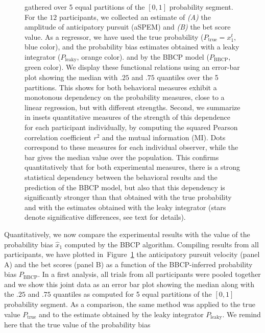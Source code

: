 \documentclass[10pt,letterpaper]{article}
\newcommand{\seeFig}[1]{Figure~\ref{fig:#1}}
\begin{document}
\begin{figure}
{gathered over 5 equal partitions of the $[0, 1]$ probability segment.
For the $12$ participants, we collected an estimate of
\textit{(A)} the amplitude of anticipatory pursuit (aSPEM)
and \textit{(B)} the bet score value.
As a regressor, we have used the true probability ($P_{\text{true}}=x_1^t$, blue color),
and the probability bias estimates obtained with a leaky integrator ($P_{\text{leaky}}$, orange color).
and by the BBCP model ($P_{\text{BBCP}}$, green color).
We display these functional relations
using an error-bar plot showing the median with $.25$ and $.75$ quantiles
over the 5 partitions.
This shows for both behavioral measures exhibit a monotonous dependency on the probability measures,
close to a linear regression, but with different strengths.
Second, we summarize in insets  quantitative measures of the strength of this dependence for each participant individually,
by computing the squared Pearson correlation coefficient $r^2$
and the mutual information (MI).
Dots correspond to these measures for each individual observer,
while the bar gives the median value over the population.
This confirms quantitatively that for both experimental measures,
there is a strong statistical dependency between
the behavioral results and the prediction of the BBCP model,
but also that this dependency is significantly stronger than that obtained
with the true probability and with the estimates obtained with the leaky integrator
(stars denote significative differences, see text for details).
}
\label{fig:results_psycho_all}
\end{figure}
Quantitatively, we now compare the experimental results
with the value of the probability bias $\hat{x}_1$
computed by the BBCP algorithm.
Compiling results from all participants,
we have plotted in~\seeFig{results_psycho_all}
the anticipatory pursuit velocity (panel A) and the bet scores (panel B)
as a function of the BBCP-inferred probability bias  $P_{\text{BBCP}}$.
In a first analysis, all trials from all participants were pooled together
and we show this joint data as an error bar plot
showing the median along with the $.25$ and $.75$ quantiles
as computed for 5 equal partitions of the $[0, 1]$ probability segment.
As a comparison, the same method was applied to the true value $P_{\text{true}}$ and
to the estimate obtained by the leaky integrator  $P_{\text{leaky}}$.
We remind here that the true value of the probability bias
\end{document}
